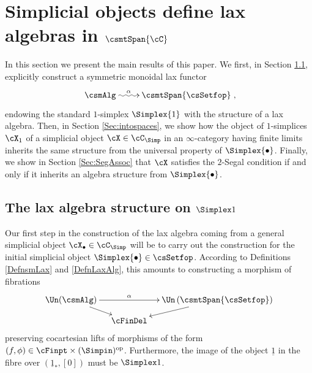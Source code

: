 \documentclass[a4paper]{article}
\numberwithin{equation}{section}
\begin{document}
\section{Simplicial objects define lax algebras in \texorpdfstring{$\csmtSpan{\cC}$}{Span(C)}}
\label{Sec:multialg}

In this section we present the main results of this paper. We first, in Section \ref{Sec:algcomb}, explicitly construct a symmetric monoidal lax functor
\begin{equation*}
 \xymatrix{\csmAlg \ar@{~>}[r]^-\alpha & \csmtSpan{\csSetfop}}, 
\end{equation*}
endowing the standard $1$-simplex $\Simplex{1}$ with the structure of a lax algebra. Then, in Section \ref{Sec:intospaces}, we show how the object of $1$-simplices $\cX_1$ of a simplicial object $\cX \in \cC_\Simp$ in an $\infty$-category having finite limits inherits the same structure from the universal property of $\Simplex{\bullet}$. Finally, we show in Section \ref{Sec:SegAssoc} that $\cX$ satisfies the $2$-Segal condition if and only if it inherits an algebra structure from $\Simplex{\bullet}$.




\subsection{The lax algebra structure on \texorpdfstring{$\Simplex 1$}{the standard 1-simplex}}
\label{Sec:algcomb}

Our first step in the construction of the lax algebra coming from a general simplicial object $\cX_\bullet \in \cC_\Simp$ will be to carry out the construction for the initial simplicial object $\Simplex{\bullet} \in \csSetfop$. According to Definitions \ref{DefnsmLax} and \ref{DefnLaxAlg}, this amounts to constructing a morphism of fibrations
\begin{equation*}
 \xymatrixrowsep{.8pc}\xymatrixcolsep{.9pc}\xymatrix{\Un(\csmAlg)\ar[rr]^-{\alpha} \ar[rd] & & \Un\left(\csmtSpan{\csSetfop}\right)\ar[ld] \\
  & \cFinDel & }
\end{equation*}
preserving cocartesian lifts of morphisms of the form $(f,\phi) \in \cFinpt\times(\Simpin)^{\rm op}$. Furthermore, the image of the object $\underline{1}$ in the fibre over $(\underline{1}_\ast,[0])$ must be $\Simplex 1$.
\end{document}
